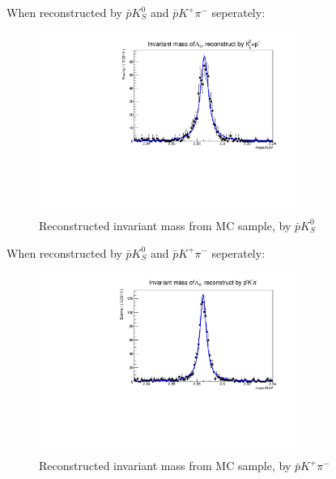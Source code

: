 \documentclass{beamer}
\begin{document}
\begin{frame}
    When reconstructed by $\bar{p} K^0_S$ and $\bar{p} K^+ \pi^-$ seperately:
    \begin{figure}
        \centering
        \includegraphics[width = 0.75\textwidth]{k0p.pdf}
        \caption{Reconstructed invariant mass from MC sample, by $\bar{p} K^0_S$ }
        \label{fig: mBC data}
      \end{figure}
\end{frame}

\begin{frame}
    When reconstructed by $\bar{p} K^0_S$ and $\bar{p} K^+ \pi^-$ seperately:
    \begin{figure}
        \centering
        \includegraphics[width = 0.75\textwidth]{unnamed.pdf}
        \caption{Reconstructed invariant mass from MC sample, by $\bar{p} K^+ \pi^-$ }
        \label{fig: mBC data}
      \end{figure}
\end{frame}
\end{document}
